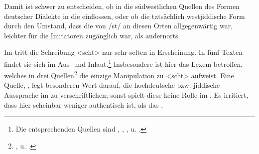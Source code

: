    \label{bspwjscht}

Damit ist schwer zu entscheiden, ob in die südwestlichen Quellen des   Formen deutscher Dialekte in die  einflossen, oder ob die tatsächlich westjiddische Form durch den Umstand, dass die  von /st/ an diesen Orten allgegenwärtig war, leichter für die Imitatoren zugänglich war, als andernorts.

Im  tritt die Schreibung <scht> nur sehr selten in Erscheinung. In fünf Texten findet sie sich im Aus- und Inlaut.\footnote{Die entsprechenden Quellen sind , , ,  u. .} Insbesondere ist hier das Lexem  betroffen, welches in drei Quellen\footnote{,  u. .} die einzige Manipulation zu <scht> aufweist. Eine Quelle, , legt besonderen Wert darauf, die hochdeutsche bzw. jiddische Aussprache im  zu verschriftlichen; sonst spielt diese keine Rolle im . Es irritiert, dass  hier scheinbar weniger authentisch ist, als das .


